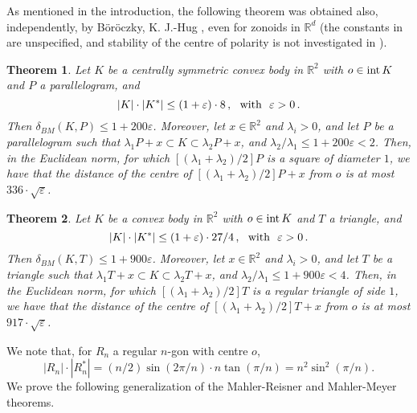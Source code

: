 \documentclass[12pt]{article}
\newtheorem{Thm}{Theorem}
\newcommand{\R}{\mathbb{R}}
\begin{document}

As mentioned in the introduction, the following theorem was obtained also,
independently, by B\"or\"oczky, K. J.-Hug \cite{BH}, even for zonoids in
${\R}^d$ (the constants in \cite{BH} are unspecified, 
and stability of the centre of polarity is not investigated in \cite{BH}).

\begin{Thm}
\label{MahlerReisnerstab}
Let $K$ be a centrally symmetric convex body in $\R^2$ with $o \in 
{\text{\rm{int}}}\,K$ and $P$ a parallelogram, and
$$
|K|\cdot|K^*|\leq (1+\varepsilon)\cdot 8\,, 
{\text{\,\,\,\,with\,\,\,\,}} \varepsilon >0 \,.
$$
Then $\delta_{BM} (K,P) \leq 1+200\varepsilon $. Moreover, let $x \in 
{\mathbb R}^2$ and $\lambda _i >0$, and let $P$ be a parallelogram such that
$\lambda _1 P + x \subset K \subset \lambda _2 P + x$, and 
$\lambda _2 / \lambda _1 \le 1+200\varepsilon < 2 $. 
Then, in the Euclidean norm, for which
$[(\lambda _1 + \lambda _2 )/2]P$ is a square of diameter $1$,
we have that the distance of the
centre of 
$[(\lambda _1 + \lambda _2)/2] P + x$ 
from $o$ is at most $336 \cdot \sqrt{ \varepsilon }$. 
\end{Thm}


\begin{Thm}
\label{MahlerMeyerstab}
Let $K$ be a convex body in $\R^2$ with $o \in 
{\text{\rm{int}}}\,K$ and $T$ a triangle, and
$$
|K|\cdot|K^*|\leq (1+\varepsilon)\cdot 27/4\,,  
{\text{\,\,\,\,with\,\,\,\,}} \varepsilon >0 \,.
$$
Then 
$\delta_{BM}(K,T)\leq 1+900 \varepsilon $. 
Moreover, let $x \in 
{\mathbb R}^2$ and $\lambda _i >0$, and let $T$ be a triangle such that
$\lambda _1 T + x \subset K \subset \lambda _2 T + x $, and 
$\lambda _2 /
\lambda _1 \le 1+900 \varepsilon < 4$. Then, in the Euclidean norm, for which
$[(\lambda _1 + \lambda _2)/2]T$ is a regular triangle of side $1$, 
we have that the distance of the
centre of $[(\lambda _1 + \lambda _2)/2]T + x$ 
from $o$ is at most $917 \cdot \sqrt{ \varepsilon }$.
\end{Thm}


We note that, for $R_n$ a regular $n$-gon with centre $o$,
$$
|R_n|\cdot|R_n^*|=(n/2)\sin(2\pi/n)\cdot n\tan(\pi/n)=n^2\sin^2(\pi/n).
$$
We prove the following generalization of
the Mahler-Reisner and Mahler-Meyer theorems.
\end{document}
